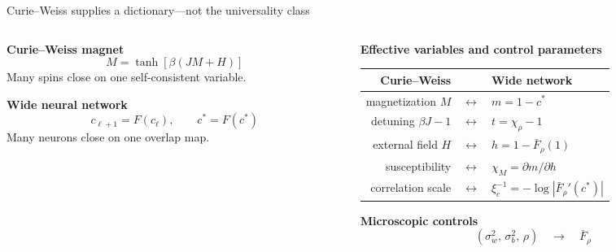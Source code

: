 \documentclass[aspectratio=169,10pt]{beamer}
\begin{document}
\begin{frame}{Curie--Weiss supplies a dictionary---not the universality class}
  \begingroup
  \footnotesize
  \begin{columns}[T,onlytextwidth]
    \begin{column}{0.43\textwidth}
      \centering
      {\small\color{forest}\bfseries Curie--Weiss magnet}
      \[
        M=\tanh\!\left[\beta(JM+H)\right]
      \]
      Many spins close on one self-consistent variable.

      \vspace{0.55em}
      {\small\color{forest}\bfseries Wide neural network}
      \[
        c_{\ell+1}=F(c_\ell),\qquad c^*=F(c^*)
      \]
      Many neurons close on one overlap map.
    \end{column}

    \begin{column}{0.53\textwidth}
      {\small\color{forest}\bfseries Effective variables and control parameters}

      \vspace{0.15em}
      \scriptsize
      \setlength{\tabcolsep}{3pt}
      \renewcommand{\arraystretch}{1.24}
      \begin{tabular}{@{}rcl@{}}
        \toprule
        \textbf{Curie--Weiss} & & \textbf{Wide network} \\
        \midrule
        magnetization \(M\) & \(\longleftrightarrow\) & \(m=1-c^*\) \\
        detuning \(\beta J-1\) & \(\longleftrightarrow\) & \(t=\chi_\rho-1\) \\
        external field \(H\) & \(\longleftrightarrow\) & \(h=1-\bar F_\rho(1)\) \\
        susceptibility & \(\longleftrightarrow\) & \(\chi_M=\partial m/\partial h\) \\
        correlation scale & \(\longleftrightarrow\) & \(\xi_c^{-1}=-\log|\bar F_\rho'(c^*)|\) \\
        \bottomrule
      \end{tabular}

      \vspace{0.55em}
      {\small\color{forest}\bfseries Microscopic controls}
      \[
        (\sigma_w^2,\,\sigma_b^2,\,\rho)
        \quad\longrightarrow\quad \bar F_\rho
      \]


\end{column}
\end{columns}
\end{frame}
\end{document}
